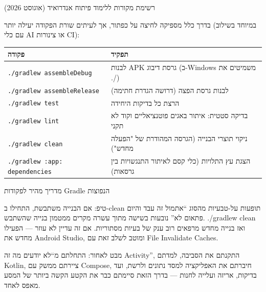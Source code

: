 \begin{center}\small\color{gray}רשימת מקורות ללימוד פיתוח אנדרואיד (אוגוסט 2026)\end{center}


בדרך כלל מספיקה לחיצה על כפתור, אך לעיתים שורת הפקודה יעילה יותר (במיוחד בשילוב עם כלי AI או צינורות CI):

\begin{center}
\begin{tabularx}{\linewidth}{|X|X|}
\hline
\textbf{פקודה} & \textbf{תפקיד} \tabularnewline
\hline
\texttt{.\allowbreak /\allowbreak gradlew assembleDebug} & לבנות APK גרסת דיבוג (ב-Windows משמיטים את ./) \tabularnewline
\texttt{.\allowbreak /\allowbreak gradlew assembleRelease} & לבנות גרסת הפצה (דרושה הגדרת חתימה) \tabularnewline
\texttt{.\allowbreak /\allowbreak gradlew test} & הרצת כל בדיקות היחידה \tabularnewline
\texttt{.\allowbreak /\allowbreak gradlew lint} & בדיקה סטטית: איתור באגים פוטנציאליים וקוד לא תקני \tabularnewline
\texttt{.\allowbreak /\allowbreak gradlew clean} & ניקוי תוצרי הבנייה (הגרסה המהודרת של "הפעלה מחדש") \tabularnewline
\texttt{.\allowbreak /\allowbreak gradlew :app: dependencies} & הצגת עץ התלויות (כלי קסם לאיתור התנגשויות בין גרסאות) \tabularnewline
\hline
\end{tabularx}
\end{center}

\begin{center}\small\color{gray}מדריך מהיר לפקודות Gradle הנפוצות\end{center}

\begin{tcbinfo}{טיפ: אם הבנייה משתבשת, התחילו ב-clean}
תופעות על-טבעיות מהסוג “אתמול זה עבד והיום פתאום לא” נובעות בשישה מתוך עשרה מקרים ממטמון בנייה שהשתבש. ./gradlew clean ואז בנייה מחדש מרפאים רוב ענק של בעיות מסתוריות. אם זה עדיין לא עוזר — הפעילו מחדש את Android Studio, ומוטב לשלב זאת עם File Invalidate Caches.

\end{tcbinfo}



מבט לאחור: התחלתם מ“לא יודעים מה זה Activity”, התקנתם את הסביבה, למדתם Kotlin, ציירתם ממשק עם Compose, חיברתם את האפליקציה למסד נתונים ולרשת, ועד בדיקות, אריזה ועלייה לחנות — בדרך הזאת סיימתם כבר את הקטע הקשה ביותר של המסע מאפס לאחד.

